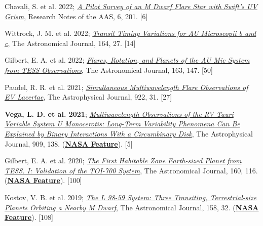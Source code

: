 \documentclass[letter,12pt]{article}
\begin{document}
\begin{etaremune}
\item {Chavali, S. et al. 2022}; \href{https://ui.adsabs.harvard.edu/abs/2022RNAAS...6..201C/abstract}{\it A Pilot Survey of an M Dwarf Flare Star with Swift’s UV Grism}, Research Notes of the AAS, 6, 201. [6]

\item {Wittrock, J. M. et al. 2022}; \href{https://ui.adsabs.harvard.edu/abs/2022AJ....164...27W/abstract}{\it Transit Timing Variations for AU Microscopii b and c}, The Astronomical Journal, 164, 27. [14]

\item Gilbert, E. A. et al. 2022; \href{https://ui.adsabs.harvard.edu/abs/2022AJ....163..147G/abstract}{\it Flares, Rotation, and Planets of the AU Mic System from TESS Observations}, The Astronomical Journal, 163, 147. [50]

\item {Paudel, R. R. et al. 2021}; 
\href{https://ui.adsabs.harvard.edu/abs/2021ApJ...922...31P/abstract}{\it Simultaneous Multiwavelength Flare Observations of EV Lacertae}, The Astrophysical Journal, 922, 31. [27]

\item {\bf Vega, L. D. et al. 2021}; \href{https://ui.adsabs.harvard.edu/abs/2021ApJ...909..138V/abstract}{\it Multiwavelength Observations of the RV Tauri Variable System U Monocerotis: Long-Term Variability Phenomena Can Be Explained by Binary Interactions With a Circumbinary Disk}, The Astrophysical Journal, 909, 138. (\href{https://www.nasa.gov/feature/goddard/2021/scientists-sketch-aged-star-system-using-over-a-century-of-observations/}{\bf NASA Feature}). [5]

\item Gilbert, E. A. et al. 2020; \href{https://ui.adsabs.harvard.edu/abs/2020AJ....160..116G/abstract}{\it The First Habitable Zone Earth-sized Planet from TESS. I: Validation of the TOI-700 System}, The Astronomical Journal, 160, 116.
(\href{https://www.nasa.gov/feature/goddard/2020/nasa-planet-hunter-finds-its-1st-earth-size-habitable-zone-world}{\bf NASA Feature}). [100]

\item Kostov, V. B. et al. 2019; \href{https://ui.adsabs.harvard.edu/abs/2019AJ....158...32K/abstract}{{\it The L 98-59 System: Three Transiting, Terrestrial-size Planets Orbiting a Nearby M Dwarf}}, The Astronomical Journal, 158, 32.
(\href{https://www.nasa.gov/feature/goddard/2019/nasa-s-tess-mission-finds-its-smallest-planet-yet}{\bf NASA Feature}). [108]


\end{etaremune}
\end{document}
